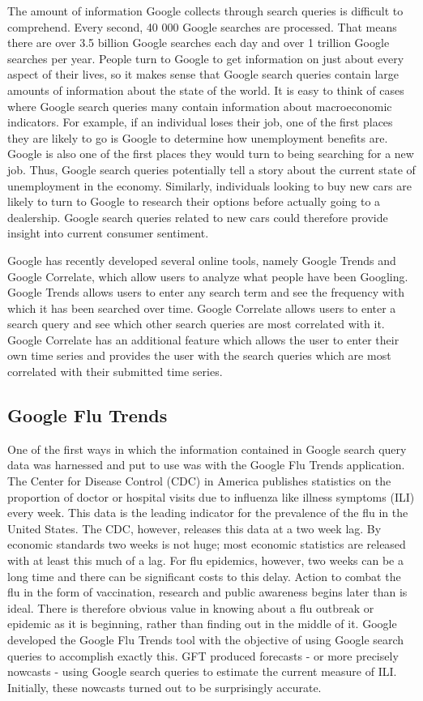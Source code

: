 \documentclass[11pt, oneside]{book}   	%
\begin{document}
The amount of information Google collects through search queries is difficult to comprehend. Every second, 40 000 Google searches are processed. That means there are over 3.5 billion Google searches each day and over 1 trillion Google searches per year. People turn to Google to get information on just about every aspect of their lives, so it makes sense that Google search queries contain large amounts of information about the state of the world. It is easy to think of cases where Google search queries many contain information about macroeconomic indicators. For example, if an individual loses their job, one of the first places they are likely to go is Google to determine how unemployment benefits are. Google is also one of the first places they would turn to being searching for a new job. Thus, Google search queries potentially tell a story about the current state of unemployment in the economy. Similarly, individuals looking to buy new cars are likely to turn to Google to research their options before actually going to a dealership. Google search queries related to new cars could therefore provide insight into current consumer sentiment. 

Google has recently developed several online tools, namely Google Trends and Google Correlate, which allow users to analyze what people have been Googling. Google Trends allows users to enter any search term and see the frequency with which it has been searched over time. Google Correlate allows users to enter a search query and see which other search queries are most correlated with it. Google Correlate has an additional feature which allows the user to enter their own time series and provides the user with the search queries which are most correlated with their submitted time series.

\subsection{Google Flu Trends}

One of the first ways in which the information contained in Google search query data was harnessed and put to use was with the Google Flu Trends application. The Center for Disease Control (CDC) in America publishes statistics on the proportion of doctor or hospital visits due to influenza like illness symptoms (ILI) every week. This data is the leading indicator for the prevalence of the flu in the United States. The CDC, however, releases this data at a two week lag. By economic standards two weeks is not huge; most economic statistics are released with at least this much of a lag. For flu epidemics, however, two weeks can be a long time and there can be significant costs to this delay. Action to combat the flu in the form of vaccination, research and public awareness begins later than is ideal. There is therefore obvious value in knowing about a flu outbreak or epidemic as it is beginning, rather than finding out in the middle of it. Google developed the Google Flu Trends tool with the objective of using Google search queries to accomplish exactly this. GFT produced forecasts - or more precisely nowcasts - using Google search queries to estimate the current measure of ILI. Initially, these nowcasts turned out to be surprisingly accurate.  
\end{document}
